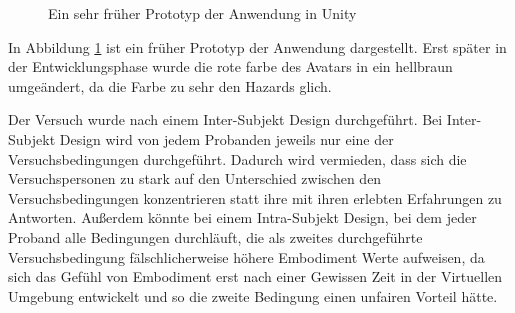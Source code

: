 \begin{figure}[h]
  \caption[Altes Setup der Anwendung]{Ein sehr früher Prototyp der Anwendung in Unity}
  \label{fig:oldSetup}
\end{figure}

In Abbildung \ref{fig:oldSetup} ist ein früher Prototyp der Anwendung dargestellt. Erst später in der Entwicklungsphase wurde die rote farbe des Avatars in ein hellbraun umgeändert, da die Farbe zu sehr den Hazards glich.


Der Versuch wurde nach einem Inter-Subjekt Design durchgeführt. Bei Inter-Subjekt Design wird von jedem Probanden jeweils nur eine der Versuchsbedingungen durchgeführt. Dadurch wird vermieden, dass sich die Versuchspersonen zu stark auf den Unterschied zwischen den Versuchsbedingungen konzentrieren statt ihre mit ihren erlebten Erfahrungen zu Antworten. Außerdem könnte bei einem Intra-Subjekt Design, bei dem jeder Proband alle Bedingungen durchläuft, die als zweites durchgeführte Versuchsbedingung fälschlicherweise höhere Embodiment Werte aufweisen, da sich das Gefühl von Embodiment erst nach einer Gewissen Zeit in der Virtuellen Umgebung entwickelt und so die zweite Bedingung einen unfairen Vorteil hätte.


